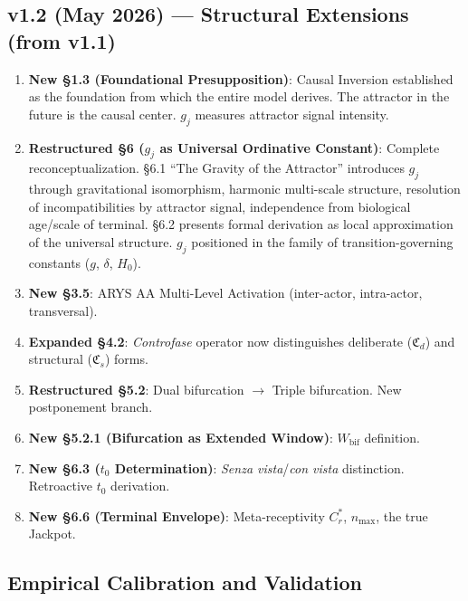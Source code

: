 \documentclass[12pt,a4paper]{article}
\newcommand{\reagmeta}{C_r^{*}}
\newcommand{\gj}{g_j}
\newcommand{\nmax}{n_{\mathrm{max}}}
\newcommand{\CFd}{\mathfrak{C}_d}        %
\newcommand{\CFs}{\mathfrak{C}_s}        %
\begin{document}
\subsection*{v1.2 (May 2026) --- Structural Extensions (from v1.1)}

\begin{enumerate}[label=\textbf{\arabic*.}]
    \item \textbf{New §1.3 (Foundational Presupposition)}: Causal Inversion established as the foundation from which the entire model derives. The attractor in the future is the causal center. $\gj$ measures attractor signal intensity.
    \item \textbf{Restructured §6 ($\gj$ as Universal Ordinative Constant)}: Complete reconceptualization. §6.1 ``The Gravity of the Attractor'' introduces $\gj$ through gravitational isomorphism, harmonic multi-scale structure, resolution of incompatibilities by attractor signal, independence from biological age/scale of terminal. §6.2 presents formal derivation as local approximation of the universal structure. $\gj$ positioned in the family of transition-governing constants ($g$, $\delta$, $H_0$).
    \item \textbf{New §3.5}: ARYS AA Multi-Level Activation (inter-actor, intra-actor, transversal).
    \item \textbf{Expanded §4.2}: \textit{Controfase} operator now distinguishes deliberate ($\CFd$) and structural ($\CFs$) forms.
    \item \textbf{Restructured §5.2}: Dual bifurcation $\to$ Triple bifurcation. New postponement branch.
    \item \textbf{New §5.2.1 (Bifurcation as Extended Window)}: $W_{\mathrm{bif}}$ definition.
    \item \textbf{New §6.3 ($t_0$ Determination)}: \emph{Senza vista}/\emph{con vista} distinction. Retroactive $t_0$ derivation.
    \item \textbf{New §6.6 (Terminal Envelope)}: Meta-receptivity $\reagmeta$, $\nmax$, the true Jackpot.
\end{enumerate}

\subsection*{Empirical Calibration and Validation}
\end{document}
